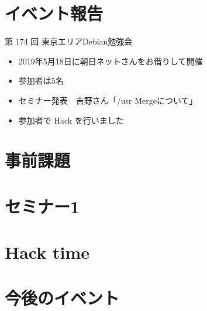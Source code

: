 \section{イベント報告}

\begin{frame}{第 174 回 東京エリアDebian勉強会}
\begin{itemize}
\item 2019年5月18日に朝日ネットさんをお借りして開催
\item 参加者は5名
\item セミナー発表　吉野さん「/usr Mergeについて」
\item 参加者で Hack を行いました
\end{itemize} 
\end{frame}


\section{事前課題}


{\footnotesize
 
}

%

\section{セミナー1}

\section{Hack time}

  
\section{今後のイベント}

